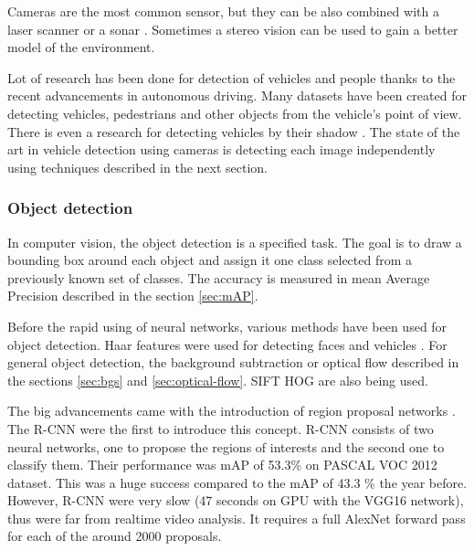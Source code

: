 \documentclass[a4paper,12pt,titlepage]{article}
\numberwithin{figure}{section}
\begin{document}
Cameras are the most common sensor, but they can be also combined with a laser scanner \cite{wender20083d, premebida2007lidar} or a sonar \cite{kim2005front, wang2003online}. Sometimes a stereo vision \cite{bertozzi2000stereo, toulminet2006vehicle} can be used to gain a better model of the environment.

Lot of research has been done for detection of vehicles and people thanks to the recent advancements in autonomous driving. Many datasets have been created \cite{apollo-scape, madhavan2017bdd, RobotCarDatasetIJRR, ncarlevaris-2015a} for detecting vehicles, pedestrians and other objects from the vehicle's point of view. There is even a research for detecting vehicles by their shadow \cite{tzomakas1998vehicle}. The state of the art in vehicle detection using cameras is detecting each image independently using techniques described in the next section.


\subsubsection{Object detection}

In computer vision, the object detection is a specified task. The goal is to draw a bounding box around each object and assign it one class selected from a previously known set of classes. The accuracy is measured in mean Average Precision described in the section \ref{sec:mAP}. 

Before the rapid using of neural networks, various methods have been used for object detection. Haar features were used for detecting faces \cite{haar, lienhart2002extended, viola2004robust} and vehicles \cite{sun2002real}. For general object detection, the background subtraction \cite{piccardi2004background, horprasert1999statistical} or optical flow \cite{naoya1990optical, quenot1992orthogonal, chen2011tracking} described in the sections \ref{sec:bgs} and \ref{sec:optical-flow}. SIFT \cite{lowe2004distinctive} HOG \cite{girshick2014rich, wang2009hog, zhu2006fast, felzenszwalb2010object, dalal2005histograms} are also being used.

The big advancements came with the introduction of region proposal networks \cite{girshick2016region}. The R-CNN \cite{DBLP:journals/corr/GirshickDDM13} were the first to introduce this concept. R-CNN consists of two neural networks, one to propose the regions of interests and the second one to classify them. Their performance was mAP of 53.3\% on PASCAL VOC 2012 dataset. This was a huge success compared to the mAP of 43.3 \%\cite{carreira2012cpmc} the year before. However, R-CNN were very slow (47 seconds on GPU with the VGG16 \cite{simonyan2014very} network), thus were far from realtime video analysis. It requires a full AlexNet forward pass for each of the around 2000 proposals.
\end{document}
